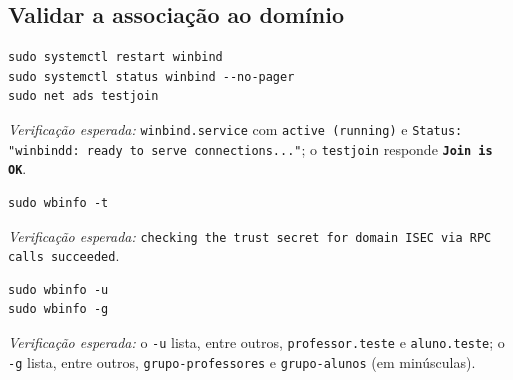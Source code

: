 
\subsection[Validar a associação ao domínio]{Validar a associação ao domínio}



\begin{lstlisting}[style=bashstyle]
sudo systemctl restart winbind
sudo systemctl status winbind --no-pager
sudo net ads testjoin
\end{lstlisting}

\emph{Verificação esperada:} \texttt{winbind.service} com \texttt{active (running)} e \texttt{Status: "winbindd: ready to serve connections..."}; o \texttt{testjoin} responde \textbf{\texttt{Join is OK}}.


\begin{lstlisting}[style=bashstyle]
sudo wbinfo -t
\end{lstlisting}

\emph{Verificação esperada:} \texttt{checking the trust secret for domain ISEC via RPC calls succeeded}.


\begin{lstlisting}[style=bashstyle]
sudo wbinfo -u
sudo wbinfo -g
\end{lstlisting}

\emph{Verificação esperada:} o \texttt{-u} lista, entre outros, \texttt{professor.teste} e \texttt{aluno.teste}; o \texttt{-g} lista, entre outros, \texttt{grupo-professores} e \texttt{grupo-alunos} (em minúsculas).

